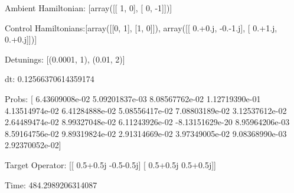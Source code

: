 \documentclass{article}
\begin{document}
    

\newpage

Ambient Hamiltonian: [array([[ 1,  0],
       [ 0, -1]])]

Control Hamiltonians:[array([[0, 1],
       [1, 0]]), array([[ 0.+0.j, -0.-1.j],
       [ 0.+1.j,  0.+0.j]])]

Detunings: [(0.0001, 1), (0.01, 2)]

 dt: 0.12566370614359174

Probs: [  6.43609008e-02   5.09201837e-03   8.08567762e-02   1.12719390e-01
   4.13514974e-02   6.41284888e-02   5.08556417e-02   7.08803189e-02
   3.12537612e-02   2.64489474e-02   8.99327048e-02   6.11243926e-02
  -8.13151629e-20   8.95964206e-03   8.59164756e-02   9.89319824e-02
   2.91314669e-02   3.97349005e-02   9.08368990e-03   2.92370052e-02]

Target Operator: [[ 0.5+0.5j -0.5-0.5j]
 [ 0.5+0.5j  0.5+0.5j]]

Time: 484.2989206314087
\end{document}
